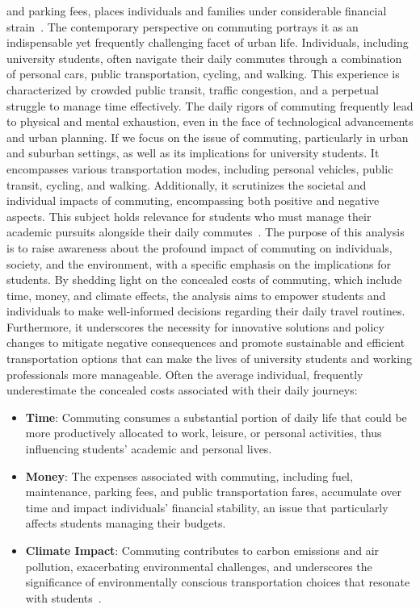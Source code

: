 and parking fees, places individuals and families under considerable financial strain~\cite{alma9921355859805762}.
The contemporary perspective on commuting portrays it as an indispensable yet frequently challenging facet of urban
life.
Individuals, including university students, often navigate their daily commutes through a combination of personal cars,
public transportation, cycling, and walking.
This experience is characterized by crowded public transit, traffic congestion, and a perpetual struggle to manage time
effectively.
The daily rigors of commuting frequently lead to physical and mental exhaustion, even in the face of technological
advancements and urban planning.
If we focus on the issue of commuting, particularly in urban and suburban settings, as well as its implications for
university students.
It encompasses various transportation modes, including personal vehicles, public transit, cycling, and walking.
Additionally, it scrutinizes the societal and individual impacts of commuting, encompassing both positive and negative
aspects.
This subject holds relevance for students who must manage their academic pursuits alongside their daily commutes~\cite{alma9921355859805762}.
The purpose of this analysis is to raise awareness about the profound impact of commuting on individuals, society, and
the environment, with a specific emphasis on the implications for students.
By shedding light on the concealed costs of commuting, which include time, money, and climate effects, the analysis aims
to empower students and individuals to make well-informed decisions regarding their daily travel routines.
Furthermore, it underscores the necessity for innovative solutions and policy changes to mitigate negative consequences
and promote sustainable and efficient transportation options that can make the lives of university students and working
professionals more manageable.
Often the average individual, frequently underestimate the concealed costs associated with their daily journeys:

\begin{itemize}
    \item \textbf{Time}: Commuting consumes a substantial portion of daily life that could be more productively
    allocated to work, leisure, or personal activities, thus influencing students' academic and personal lives.
    \item \textbf{Money}: The expenses associated with commuting, including fuel, maintenance, parking fees, and public
    transportation fares, accumulate over time and impact individuals' financial stability, an issue that particularly
    affects students managing their budgets.
    \item \textbf{Climate Impact}: Commuting contributes to carbon emissions and air pollution, exacerbating
    environmental challenges, and underscores the significance of environmentally conscious transportation choices that
    resonate with students~\cite{alma9921355859805762}.
\end{itemize}

